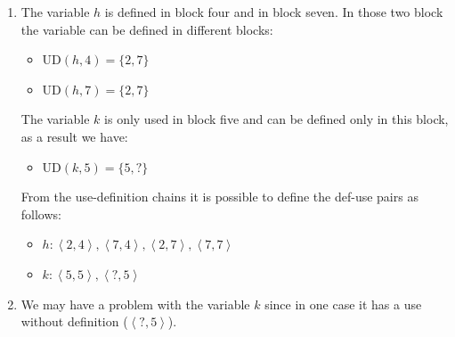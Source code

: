 \begin{enumerate}
\begin{figure}[H]
        \end{figure}
    \item The variable $h$ is defined in block four and in block seven. 
        In those two block the variable can be defined in different blocks: 
        \begin{itemize}
            \item $\text{UD}(h,4)=\{2,7\}$
            \item $\text{UD}(h,7)=\{2,7\}$
        \end{itemize}
        The variable $k$ is only used in block five and can be defined only in this block, as a result we have: 
        \begin{itemize}
            \item $\text{UD}(k,5)=\{5,?\}$
        \end{itemize}
        From the use-definition chains it is possible to define the def-use pairs as follows: 
        \begin{itemize}
            \item $h: \left\langle 2,4 \right\rangle, \left\langle 7,4\right\rangle, \left\langle 2,7\right\rangle, \left\langle 7,7\right\rangle$
            \item $k: \left\langle 5,5 \right\rangle, \left\langle ?,5\right\rangle$
        \end{itemize}
    \item We may have a problem with the variable $k$ since in one case it has a use without definition ($\left\langle ?,5\right\rangle$).
\end{enumerate}